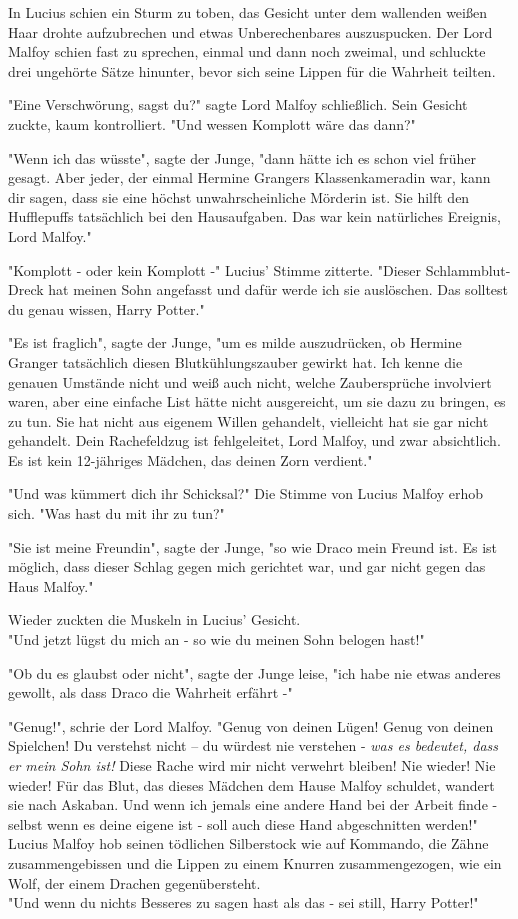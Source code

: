 {In Lucius schien ein Sturm zu toben, das Gesicht unter dem wallenden weißen Haar drohte aufzubrechen und etwas Unberechenbares auszuspucken. Der Lord Malfoy schien fast zu sprechen, einmal und dann noch zweimal, und schluckte drei ungehörte Sätze hinunter, bevor sich seine Lippen für die Wahrheit teilten.

"Eine Verschwörung, sagst du?" sagte Lord Malfoy schließlich. Sein Gesicht zuckte, kaum kontrolliert. "Und wessen Komplott wäre das dann?"

"Wenn ich das wüsste", sagte der Junge, "dann hätte ich es schon viel früher gesagt. Aber jeder, der einmal Hermine Grangers Klassenkameradin war, kann dir sagen, dass sie eine höchst unwahrscheinliche Mörderin ist. Sie hilft den Hufflepuffs tatsächlich bei den Hausaufgaben. Das war kein natürliches Ereignis, Lord Malfoy."

"Komplott - oder kein Komplott -" Lucius' Stimme zitterte. "Dieser Schlammblut-Dreck hat meinen Sohn angefasst und dafür werde ich sie auslöschen. Das solltest du genau wissen, Harry Potter."

"Es ist fraglich", sagte der Junge, "um es milde auszudrücken, ob Hermine Granger tatsächlich diesen Blutkühlungszauber gewirkt hat. Ich kenne die genauen Umstände nicht und weiß auch nicht, welche Zaubersprüche involviert waren, aber eine einfache List hätte nicht ausgereicht, um sie dazu zu bringen, es zu tun. Sie hat nicht aus eigenem Willen gehandelt, vielleicht hat sie gar nicht gehandelt. Dein Rachefeldzug ist fehlgeleitet, Lord Malfoy, und zwar absichtlich. Es ist kein 12-jähriges Mädchen, das deinen Zorn verdient."

"Und was kümmert dich ihr Schicksal?" Die Stimme von Lucius Malfoy erhob sich. "Was hast du mit ihr zu tun?"

"Sie ist meine Freundin", sagte der Junge, "so wie Draco mein Freund ist. Es ist möglich, dass dieser Schlag gegen mich gerichtet war, und gar nicht gegen das Haus Malfoy."

Wieder zuckten die Muskeln in Lucius' Gesicht.\\ "Und jetzt lügst du mich an - so wie du meinen Sohn belogen hast!"

"Ob du es glaubst oder nicht", sagte der Junge leise, "ich habe nie etwas anderes gewollt, als dass Draco die Wahrheit erfährt -"

"Genug!", schrie der Lord Malfoy. "Genug von deinen Lügen! Genug von deinen Spielchen! Du verstehst nicht -- du würdest nie verstehen - \emph{was es bedeutet, dass er mein Sohn ist!} Diese Rache wird mir nicht verwehrt bleiben! Nie wieder! Nie wieder! Für das Blut, das dieses Mädchen dem Hause Malfoy schuldet, wandert sie nach Askaban. Und wenn ich jemals eine andere Hand bei der Arbeit finde - selbst wenn es deine eigene ist - soll auch diese Hand abgeschnitten werden!"\\ Lucius Malfoy hob seinen tödlichen Silberstock wie auf Kommando, die Zähne zusammengebissen und die Lippen zu einem Knurren zusammengezogen, wie ein Wolf, der einem Drachen gegenübersteht.\\ "Und wenn du nichts Besseres zu sagen hast als das - sei still, Harry Potter!"

}
